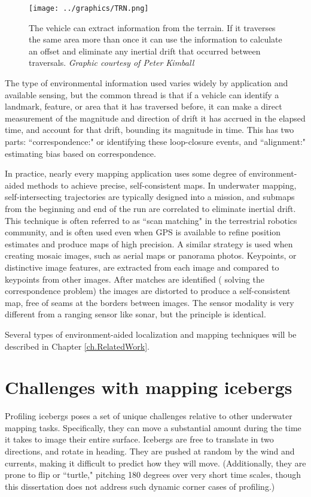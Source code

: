\begin{figure}[!htb]
   \centering
   \texttt{[image: ../graphics/TRN.png]} %
   \caption{The vehicle can extract information from the terrain. If it traverses the same area more than once it can use the information to calculate an offset and eliminate any inertial drift that occurred between traversals. \emph{Graphic courtesy of Peter Kimball}}
   \label{fig:TRN}
\end{figure}

The type of environmental information used varies widely by application and available sensing, but the common thread is that if a vehicle can identify a landmark, feature, or area that it has traversed before, it can make a direct measurement of the magnitude and direction of drift it has accrued in the elapsed time, and account for that drift, bounding its magnitude in time. This has two parts: ``correspondence:" or identifying these loop-closure events, and ``alignment:" estimating bias based on correspondence. 

In practice, nearly every mapping application uses some degree of environment-aided methods to achieve precise, self-consistent maps. In underwater mapping, self-intersecting trajectories are typically designed into a mission, and submaps from the beginning and end of the run are correlated to eliminate inertial drift. This technique is often referred to as ``scan matching" in the terrestrial robotics community, and is often used even when GPS is available to refine position estimates and produce maps of high precision. A similar strategy is used when creating mosaic images, such as aerial maps or panorama photos.  Keypoints, or distinctive image features, are extracted from each image and compared to keypoints from other images. After matches are identified ( solving the correspondence problem) the images are distorted to produce a self-consistent map, free of seams at the borders between images. The sensor modality is very different from a ranging sensor like sonar, but the principle is identical. 

Several types of environment-aided localization and mapping techniques will be described in Chapter \ref{ch.RelatedWork}.

\section{Challenges with mapping icebergs}

Profiling icebergs poses a set of unique challenges relative to other underwater mapping tasks. Specifically, they can move a substantial amount during the time it takes to image their entire surface. Icebergs are free to translate in two directions, and rotate in heading. They are pushed at random by the wind  and currents, making it difficult to predict how they will move. (Additionally, they are prone to flip or ``turtle," pitching 180 degrees over very short time scales, though this dissertation does not address such dynamic corner cases of profiling.) 


